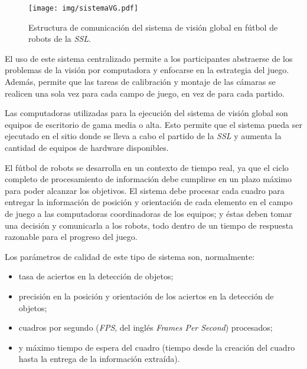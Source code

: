 \begin{figure}[!htb]

	\texttt{[image: img/sistemaVG.pdf]}

	\caption{Estructura de comunicación del sistema de visión global en
	fútbol de robots de la \emph{SSL}.}

	\label{sistemaVG}

\end{figure}

El uso de este sistema centralizado permite a los participantes abstraerse de
los problemas de la visión por computadora y enfocarse en la estrategia del
juego. Además, permite que las tareas de calibración y montaje de las cámaras se
realicen una sola vez para cada campo de juego, en vez de para cada partido.

Las computadoras utilizadas para la ejecución del sistema de visión global son
equipos de escritorio de gama media o alta. Esto permite que el sistema pueda
ser ejecutado en el sitio donde se lleva a cabo el partido de la \emph{SSL} y
aumenta la cantidad de equipos de hardware disponibles.

El fútbol de robots se desarrolla en un contexto de tiempo real, ya que el
ciclo completo de procesamiento de información debe cumplirse en un plazo
máximo para poder alcanzar los objetivos. El sistema debe procesar cada
cuadro para entregar la información de posición y orientación de cada elemento
en el campo de juego a las computadoras coordinadoras de los equipos; y éstas
deben tomar una decisión y comunicarla a los robots, todo dentro de un tiempo
de respuesta razonable para el progreso del juego.

Los parámetros de calidad de este tipo de sistema son, normalmente:

\begin{itemize}

	\item 	tasa de aciertos en la detección de objetos;

	\item 	precisión en la posición y orientación de los aciertos en la
		detección de objetos;

	\item 	cuadros por segundo (\emph{FPS}, del inglés \emph{Frames Per
		Second}) procesados;

	\item 	y máximo tiempo de espera del cuadro (tiempo desde la creación
		del cuadro hasta la entrega de la información extraída).

\end{itemize}

